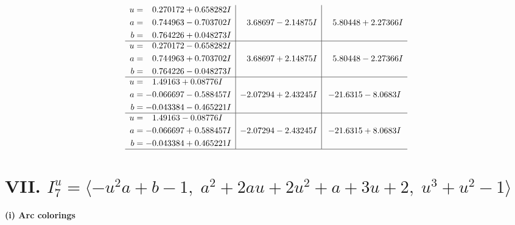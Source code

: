 \documentclass[1p]{elsarticle_modified}
\theoremstyle{definition}
\begin{document}
$$\begin{array}{c|c|c}
\begin{aligned}
u &= \phantom{-}0.270172 + 0.658282 I \\
a &= \phantom{-}0.744963 - 0.703702 I \\
b &= \phantom{-}0.764226 + 0.048273 I\end{aligned}
 & \phantom{-}3.68697 - 2.14875 I & \phantom{-}5.80448 + 2.27366 I \\ \hline\begin{aligned}
u &= \phantom{-}0.270172 - 0.658282 I \\
a &= \phantom{-}0.744963 + 0.703702 I \\
b &= \phantom{-}0.764226 - 0.048273 I\end{aligned}
 & \phantom{-}3.68697 + 2.14875 I & \phantom{-}5.80448 - 2.27366 I \\ \hline\begin{aligned}
u &= \phantom{-}1.49163 + 0.08776 I \\
a &= -0.066697 - 0.588457 I \\
b &= -0.043384 - 0.465221 I\end{aligned}
 & -2.07294 + 2.43245 I & -21.6315 - 8.0683 I \\ \hline\begin{aligned}
u &= \phantom{-}1.49163 - 0.08776 I \\
a &= -0.066697 + 0.588457 I \\
b &= -0.043384 + 0.465221 I\end{aligned}
 & -2.07294 - 2.43245 I & -21.6315 + 8.0683 I\\
 \hline 
 \end{array}$$\newpage\newpage\renewcommand{\arraystretch}{1}
\centering \section*{VII. $I^u_{7}= \langle - u^2 a+b-1,\;a^2+2 a u+2 u^2+a+3 u+2,\;u^3+u^2-1 \rangle$}
\flushleft \textbf{(i) Arc colorings}\\
\end{document}
